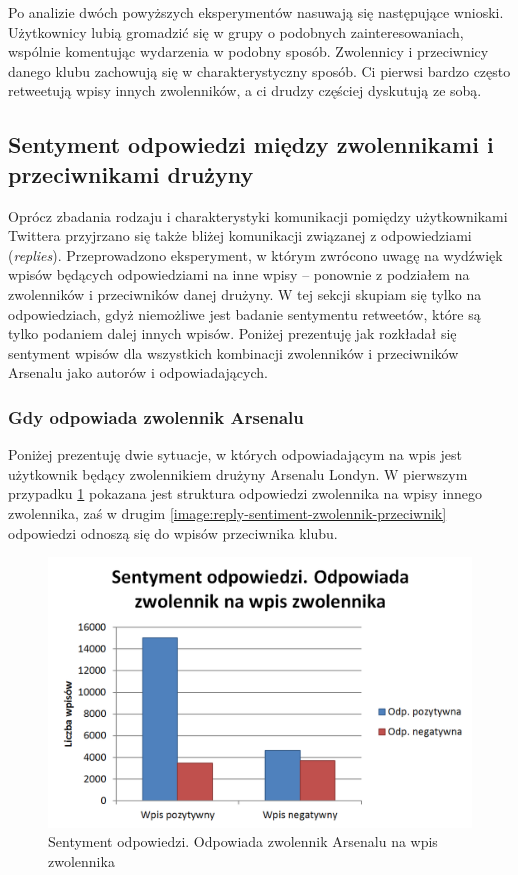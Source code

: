Po analizie dwóch powyższych eksperymentów nasuwają się następujące wnioski.
Użytkownicy lubią gromadzić się w grupy o podobnych zainteresowaniach,
wspólnie komentując wydarzenia w podobny sposób. Zwolennicy i przeciwnicy
danego klubu zachowują się w charakterystyczny sposób. Ci pierwsi bardzo często
retweetują wpisy innych zwolenników, a ci drudzy częściej dyskutują ze sobą.





\subsection{Sentyment odpowiedzi między zwolennikami i przeciwnikami drużyny}
\label{subsection:sentymentwrelacjach}
Oprócz zbadania rodzaju i charakterystyki komunikacji pomiędzy użytkownikami 
Twittera przyjrzano się także bliżej komunikacji związanej z odpowiedziami 
(\textit{replies}). Przeprowadzono eksperyment, w którym zwrócono uwagę
na wydźwięk wpisów będących odpowiedziami na inne wpisy -- ponownie z podziałem
na zwolenników i przeciwników danej drużyny. W tej sekcji skupiam się tylko na
odpowiedziach, gdyż niemożliwe jest badanie sentymentu retweetów, które są
tylko podaniem dalej innych wpisów. Poniżej prezentuję jak rozkładał się
sentyment wpisów dla wszystkich kombinacji zwolenników i przeciwników
Arsenalu jako autorów i odpowiadających.


\subsubsection{Gdy odpowiada zwolennik Arsenalu}
Poniżej prezentuję dwie sytuacje, w których odpowiadającym na wpis jest
użytkownik będący zwolennikiem drużyny Arsenalu Londyn. W pierwszym przypadku
\ref{image:reply-sentiment-zwolennik-zwolennik} pokazana jest struktura
odpowiedzi zwolennika na wpisy innego zwolennika, zaś w drugim
\ref{image:reply-sentiment-zwolennik-przeciwnik} odpowiedzi odnoszą się do
wpisów przeciwnika klubu.

\begin{figure}[ht!]
\centering
\includegraphics[width=120mm]{img/reply-sentiment-zwolennik-zwolennik.png}
\caption{Sentyment odpowiedzi. Odpowiada zwolennik Arsenalu na wpis zwolennika}
\label{image:reply-sentiment-zwolennik-zwolennik}
\end{figure}


